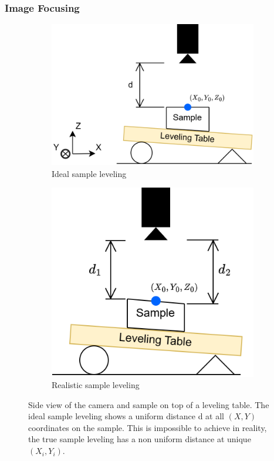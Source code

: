 \documentclass[a4paper,12pt]{article}
\begin{document}
\subsubsection{Image Focusing}

\begin{figure}
  \centering
  \begin{subfigure}{.5\textwidth}
    \centering
    \includegraphics[height=0.5\linewidth]{../diagrams/sample_setup_ideal.png}
    \caption{Ideal sample leveling}
    \label{fig:ideal_levelling}
  \end{subfigure}%
  \begin{subfigure}{.5\textwidth}
    \centering
    \includegraphics[height=0.5\linewidth]{../diagrams/sample_setup_realistic.png}
    \caption{Realistic sample leveling}
    \label{fig:realistic_levelling}
  \end{subfigure}
  \caption{Side view of the camera and sample on top of a leveling table. The ideal sample leveling shows a uniform distance d at all $(X,Y)$ coordinates on the sample. This is impossible to achieve in reality, the true sample leveling has a non uniform distance at unique $(X_i, Y_i)$.}
  \label{fig:sample_levelling}
\end{figure}
\end{document}
